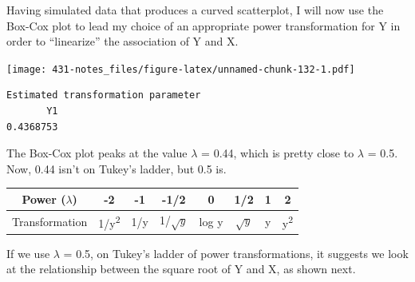 \documentclass[
]{book}
\newenvironment{Shaded}{\begin{snugshade}}{\end{snugshade}}
\newcommand{\KeywordTok}[1]{\textcolor[rgb]{0.13,0.29,0.53}{\textbf{#1}}}
\newcommand{\NormalTok}[1]{#1}
\newcommand{\OperatorTok}[1]{\textcolor[rgb]{0.81,0.36,0.00}{\textbf{#1}}}
\newcommand{\StringTok}[1]{\textcolor[rgb]{0.31,0.60,0.02}{#1}}
\begin{document}
Having simulated data that produces a curved scatterplot, I will now use the Box-Cox plot to lead my choice of an appropriate power transformation for Y in order to ``linearize'' the association of Y and X.

\begin{Shaded}
\end{Shaded}

\texttt{[image: 431-notes\_files/figure-latex/unnamed-chunk-132-1.pdf]}

\begin{Shaded}
\end{Shaded}

\begin{verbatim}
Estimated transformation parameter 
       Y1 
0.4368753 
\end{verbatim}

The Box-Cox plot peaks at the value \(\lambda\) = 0.44, which is pretty close to \(\lambda\) = 0.5. Now, 0.44 isn't on Tukey's ladder, but 0.5 is.

\begin{longtable}[]{@{}cccccccc@{}}
\toprule
Power (\(\lambda\)) & -2 & -1 & -1/2 & 0 & 1/2 & 1 & 2\tabularnewline
\midrule
\endhead
Transformation & 1/y\textsuperscript{2} & 1/y & 1/\(\sqrt{y}\) & log y & \(\sqrt{y}\) & y & y\textsuperscript{2}\tabularnewline
\bottomrule
\end{longtable}

If we use \(\lambda\) = 0.5, on Tukey's ladder of power transformations, it suggests we look at the relationship between the square root of Y and X, as shown next.
\end{document}

